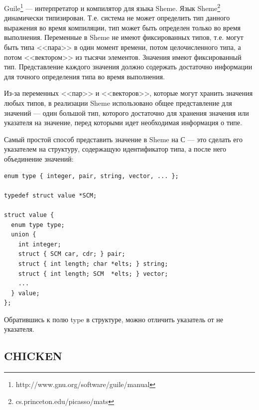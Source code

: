 Guile\footnote{http://www.gnu.org/software/guile/manual} — интерпретатор и компилятор для языка Sheme.
Язык Sheme\footnote{cs.princeton.edu/picasso/mats} динамически типизирован.
Т.е. система не может определить тип данного выражения во время компиляции, тип может быть определен только во время выполнения.
Переменные в Sheme не имеют фиксированных типов, т.е. могут быть
типа <<пара>> в один момент времени, потом целочисленного типа, а потом <<вектором>> из тысячи элементов. Значения
имеют фиксированный тип. Представление каждого значения должно содержать достаточно
информации для точного определения типа во время выполнения.

Из-за переменных <<пар>> и <<векторов>>, которые могут хранить значения любых типов,
в реализации Sheme использовано общее представление для значений — 
один большой тип, которого достаточно для хранения значения или указателя на значение,
перед которыми идет необходимая информация о типе.

Самый простой способ представить значение в Sheme на С — это сделать его указателем на структуру, содержащую идентификатор типа, а после него объединение 
 значений:

\begin{lstlisting}
enum type { integer, pair, string, vector, ... };
  
typedef struct value *SCM;
  
struct value {
  enum type type;
  union {
    int integer;
    struct { SCM car, cdr; } pair;
    struct { int length; char *elts; } string;
    struct { int length; SCM  *elts; } vector;
    ...
  } value;
};
\end{lstlisting}

Обратившись к полю type в структуре, можно отличить указатель от не указателя.

\subsection {CHICKEN}

